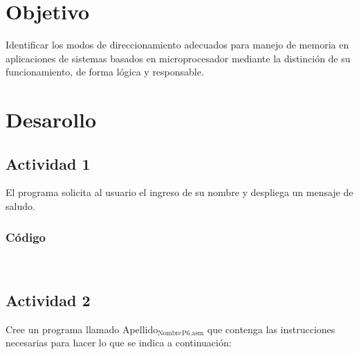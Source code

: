 \documentclass[12pt]{article}
\begin{document}
\section*{Objetivo}
\label{sec:org69464ad}
Identificar los modos de direccionamiento adecuados para manejo de memoria en aplicaciones de sistemas basados en microprocesador mediante la distinción de su funcionamiento, de forma lógica y responsable.

\section*{Desarollo}
\label{sec:org3b0ad69}
\subsection*{Actividad 1}
\label{sec:orgc795b95}
El programa solicita al usuario el ingreso de su nombre y despliega un mensaje de saludo.

\subsubsection*{Código}
\label{sec:orgf6ffd43}
\\ 


\subsection*{Actividad 2}
\label{sec:org9bd64ca}
Cree un programa llamado Apellido\(_{\text{Nombre}}\)\(_{\text{P6.asm}}\) que contenga las instrucciones necesarias para hacer lo que se indica a continuación:
\end{document}
